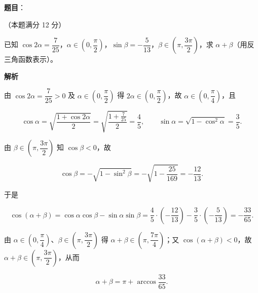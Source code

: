 \begin{answer}

\textbf{题目}：

（本题满分 12 分）

已知 $\cos 2\alpha=\dfrac{7}{25}$，$\alpha\in\left(0,\dfrac{\pi}{2}\right)$，$\sin\beta=-\dfrac{5}{13}$，$\beta\in\left(\pi,\dfrac{3\pi}{2}\right)$，求 $\alpha+\beta$（用反三角函数表示）。

\textbf{解析}

由 $\cos 2\alpha=\dfrac{7}{25}>0$ 及 $\alpha\in\left(0,\dfrac{\pi}{2}\right)$ 得 $2\alpha\in\left(0,\dfrac{\pi}{2}\right)$，故 $\alpha\in\left(0,\dfrac{\pi}{4}\right)$，且

\nopagebreak[4]
\[
\cos\alpha=\sqrt{\frac{1+\cos 2\alpha}{2}}=\sqrt{\frac{1+\frac{7}{25}}{2}}=\frac{4}{5},\qquad
\sin\alpha=\sqrt{1-\cos^{2}\alpha}=\frac{3}{5}.
\]

由 $\beta\in\left(\pi,\dfrac{3\pi}{2}\right)$ 知 $\cos\beta<0$，故

\nopagebreak[4]
\[
\cos\beta=-\sqrt{1-\sin^{2}\beta}=-\sqrt{1-\frac{25}{169}}=-\frac{12}{13}.
\]

于是

\nopagebreak[4]
\[
\cos(\alpha+\beta)=\cos\alpha\cos\beta-\sin\alpha\sin\beta
=\frac{4}{5}\cdot\left(-\frac{12}{13}\right)-\frac{3}{5}\cdot\left(-\frac{5}{13}\right)
=-\frac{33}{65}.
\]

由 $\alpha\in\left(0,\dfrac{\pi}{4}\right)$、$\beta\in\left(\pi,\dfrac{3\pi}{2}\right)$ 得 $\alpha+\beta\in\left(\pi,\dfrac{7\pi}{4}\right)$；又 $\cos(\alpha+\beta)<0$，故 $\alpha+\beta\in\left(\pi,\dfrac{3\pi}{2}\right)$，从而

\nopagebreak[4]
\[
\alpha+\beta=\pi+\arccos\frac{33}{65}.
\]


\end{answer}
